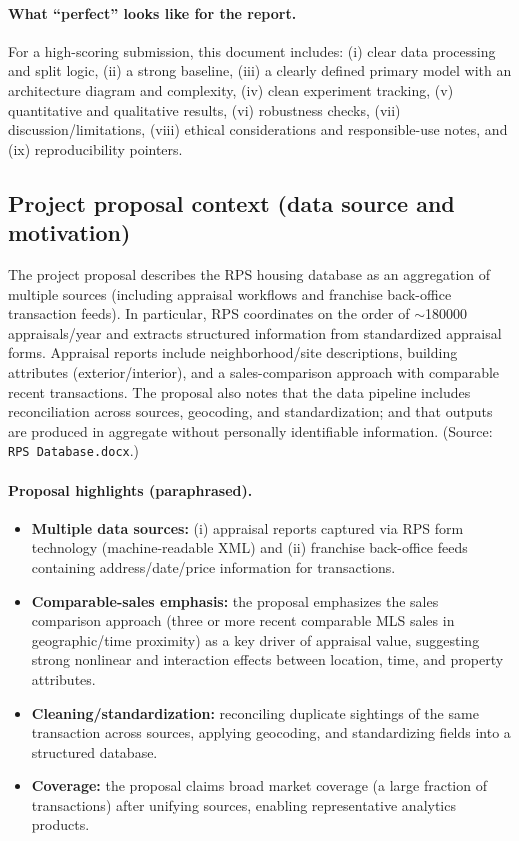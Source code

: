 \documentclass[11pt]{article}
\begin{document}
\paragraph{What ``perfect'' looks like for the report.}
For a high-scoring submission, this document includes: (i) clear data processing and split logic, (ii) a strong baseline, (iii) a clearly defined primary model with an architecture diagram and complexity, (iv) clean experiment tracking, (v) quantitative and qualitative results, (vi) robustness checks, (vii) discussion/limitations, (viii) ethical considerations and responsible-use notes, and (ix) reproducibility pointers.

\subsection{Project proposal context (data source and motivation)}
The project proposal describes the RPS housing database as an aggregation of multiple sources (including appraisal workflows and franchise back-office transaction feeds). In particular, RPS coordinates on the order of \(\sim\)\num{180000} appraisals/year and extracts structured information from standardized appraisal forms. Appraisal reports include neighborhood/site descriptions, building attributes (exterior/interior), and a sales-comparison approach with comparable recent transactions. The proposal also notes that the data pipeline includes reconciliation across sources, geocoding, and standardization; and that outputs are produced in aggregate without personally identifiable information. (Source: \texttt{RPS Database.docx}.)

\paragraph{Proposal highlights (paraphrased).}
\begin{itemize}[leftmargin=*]
  \item \textbf{Multiple data sources:} (i) appraisal reports captured via RPS form technology (machine-readable XML) and (ii) franchise back-office feeds containing address/date/price information for transactions.
  \item \textbf{Comparable-sales emphasis:} the proposal emphasizes the sales comparison approach (three or more recent comparable MLS sales in geographic/time proximity) as a key driver of appraisal value, suggesting strong nonlinear and interaction effects between location, time, and property attributes.
  \item \textbf{Cleaning/standardization:} reconciling duplicate sightings of the same transaction across sources, applying geocoding, and standardizing fields into a structured database.
  \item \textbf{Coverage:} the proposal claims broad market coverage (a large fraction of transactions) after unifying sources, enabling representative analytics products.
\end{itemize}
\end{document}
